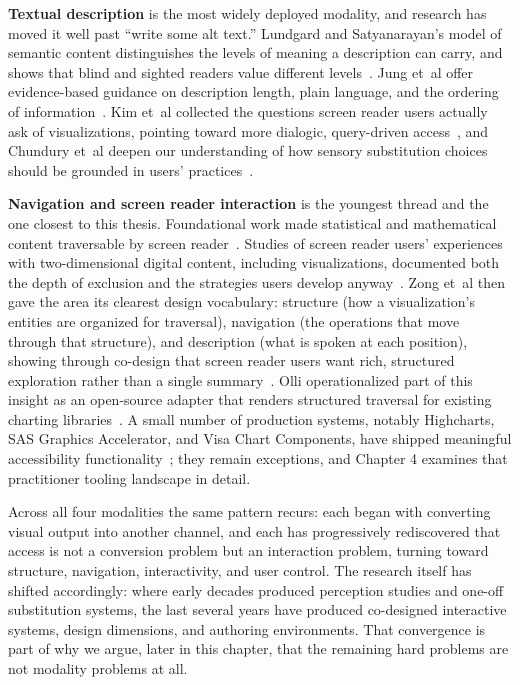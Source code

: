 \documentclass[12pt]{cmuthesis}
\newcommand{\ea}{{et~al\xperiod}\xspace}
\begin{document}
\textbf{Textual description} is the most widely deployed modality, and research has moved it well past ``write some alt text.'' Lundgard and Satyanarayan's model of semantic content distinguishes the levels of meaning a description can carry, and shows that blind and sighted readers value different levels~\cite{Lundgard2022Accessible}. Jung \ea offer evidence-based guidance on description length, plain language, and the ordering of information~\cite{Jung2022Communicating}. Kim \ea collected the questions screen reader users actually ask of visualizations, pointing toward more dialogic, query-driven access~\cite{Kim2023Exploring}, and Chundury \ea deepen our understanding of how sensory substitution choices should be grounded in users' practices~\cite{Chundury2022Towards}.
 
\textbf{Navigation and screen reader interaction} is the youngest thread and the one closest to this thesis. Foundational work made statistical and mathematical content traversable by screen reader~\cite{Godfrey2018Accessible, Sorge2016Polyfilling}. Studies of screen reader users' experiences with two-dimensional digital content, including visualizations, documented both the depth of exclusion and the strategies users develop anyway~\cite{Schaadhardt2021Understanding, Sharif2021}. Zong \ea then gave the area its clearest design vocabulary: structure (how a visualization's entities are organized for traversal), navigation (the operations that move through that structure), and description (what is spoken at each position), showing through co-design that screen reader users want rich, structured exploration rather than a single summary~\cite{Zong2022Rich}. Olli operationalized part of this insight as an open-source adapter that renders structured traversal for existing charting libraries~\cite{Blanco2022olli}. A small number of production systems, notably Highcharts, SAS Graphics Accelerator, and Visa Chart Components, have shipped meaningful accessibility functionality~\cite{Highsoft, SASSAS, VisaVisa}; they remain exceptions, and Chapter 4 examines that practitioner tooling landscape in detail.
 
Across all four modalities the same pattern recurs: each began with converting visual output into another channel, and each has progressively rediscovered that access is not a conversion problem but an interaction problem, turning toward structure, navigation, interactivity, and user control. The research itself has shifted accordingly: where early decades produced perception studies and one-off substitution systems, the last several years have produced co-designed interactive systems, design dimensions, and authoring environments. That convergence is part of why we argue, later in this chapter, that the remaining hard problems are not modality problems at all.
 
\end{document}
